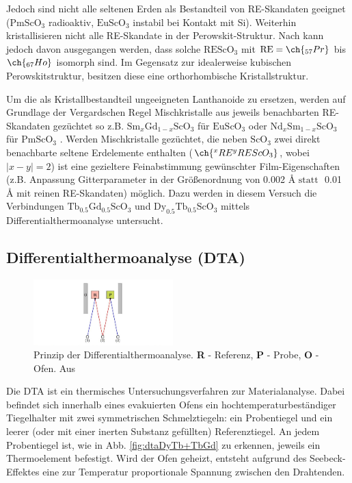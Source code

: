 \documentclass[aps,twocolumn,secnumarabic,nobalancelastpage,amsmath,amssymb,
nofootinbib,superscriptaddress]{revtex4-1}
\begin{document}
Jedoch sind nicht alle seltenen Erden als Bestandteil von RE-Skandaten geeignet ($\text{PmScO}_3$ radioaktiv, $\text{EuScO}_3$ instabil bei Kontakt mit Si).
Weiterhin kristallisieren nicht alle RE-Skandate in der Perowskit-Struktur. Nach \cite{perowskHoPr} kann jedoch davon ausgegangen werden, dass solche $\text{REScO}_3$ mit
$\text{RE}=\ch{_{57}Pr}$ bis $\ch{_{67}Ho}$ isomorph sind. Im Gegensatz zur idealerweise kubischen Perowskitstruktur, besitzen diese eine orthorhombische Kristallstruktur.

Um die als Kristallbestandteil ungeeigneten Lanthanoide zu ersetzen, werden auf Grundlage der Vergardschen Regel Mischkristalle aus jeweils benachbarten RE-Skandaten gezüchtet so z.B.
$\text{Sm}_x\text{Gd}_{1-x}\text{ScO}_3$ für $\text{EuScO}_3$ oder $\text{Nd}_x\text{Sm}_{1-x}\text{ScO}_3$ für $\text{PmScO}_3$ \cite{paperK}. Werden Mischkristalle gezüchtet,
die neben $\text{ScO}_3$ zwei direkt benachbarte seltene Erdelemente enthalten ($\ch{^{x}RE^{y}REScO_3}$, wobei $|x-y|=2$) ist eine gezieltere Feinabstimmung gewünschter
Film-Eigenschaften (z.B. Anpassung Gitterparameter in der Größenordnung von 0.002 \AA$\text{ statt }$ 0.01 \AA$\text{ mit}$ reinen RE-Skandaten) möglich. Dazu werden in diesem Versuch
die Verbindungen $\text{Tb}_{0.5}\text{Gd}_{0.5}\text{ScO}_3$ und $\text{Dy}_{0.5}\text{Tb}_{0.5}\text{ScO}_3$ mittels Differentialthermoanalyse untersucht.

\subsection{Differentialthermoanalyse (DTA)}
\begin{figure}[b]
  \centering
  \includegraphics[width=0.48\textwidth]{../img/exp.jpg}
  \caption{\label{fig:exp} Prinzip der Differentialthermoanalyse. \textbf{R} - Referenz, \textbf{P} - Probe, \textbf{O} - Ofen. Aus \cite{versuchsbeschr}}
\end{figure}

\noindent Die DTA ist ein thermisches Untersuchungsverfahren zur Materialanalyse. Dabei befindet sich innerhalb eines evakuierten Ofens ein hochtemperaturbeständiger Tiegelhalter
mit zwei symmetrischen Schmelztiegeln: ein Probentiegel und ein leerer (oder mit einer inerten Substanz gefüllten) Referenztiegel. An jedem Probentiegel ist,
wie in Abb. \ref{fig:dtaDyTb+TbGd} zu erkennen, jeweils ein Thermoelement befestigt. Wird der Ofen geheizt, entsteht aufgrund des Seebeck-Effektes eine zur Temperatur proportionale Spannung zwischen den Drahtenden.
\end{document}
